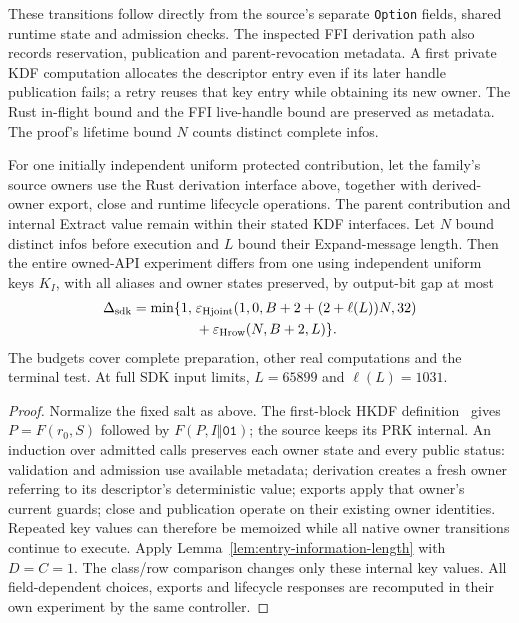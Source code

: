 These transitions follow directly from the source's separate
\texttt{Option} fields, shared runtime state and admission checks. The inspected
FFI derivation path also records reservation, publication and parent-revocation
metadata. A first private KDF computation allocates the descriptor
entry even if its later handle publication fails; a retry reuses that key
entry while obtaining its new owner. The Rust in-flight bound and the
FFI live-handle bound are preserved as metadata. The proof's lifetime bound
$N$ counts distinct complete infos.

\begin{proposition}
\label{prop:sdk-purpose-table}
For one initially independent uniform protected contribution, let the
family's source owners use the Rust derivation interface above, together with
derived-owner export, close and runtime lifecycle operations. The parent
contribution and internal Extract value remain within their stated KDF
interfaces. Let $N$ bound distinct infos before execution and $L$ bound their
Expand-message length. Then the entire owned-API experiment differs from
one using independent uniform keys $K_I$, with all aliases and owner states
preserved, by output-bit gap at most
\begin{equation}
\begin{split}
 \Delta_{\rm sdk}=\min\{1,\;&
 \varepsilon_{\rm Hjoint}(1,0,B+2+(2+\ell(L))N,32)\\
 &+\varepsilon_{\rm Hrow}(N,B+2,L)\}.
\end{split}
 \label{eq:sdk-purpose-error}
\end{equation}
The budgets cover complete preparation, other real computations and the
terminal test. At full SDK input limits, $L=65899$ and $\ell(L)=1031$.
\end{proposition}
\begin{proof}
Normalize the fixed salt as above. The first-block HKDF definition~\cite{rfc5869}
gives $P=F(r_0,S)$ followed by $F(P,I\Vert\mathtt{01})$; the source keeps
its PRK internal.
An induction over admitted calls preserves each owner state and every
public status: validation and admission use available metadata; derivation
creates a fresh owner referring to its descriptor's deterministic value;
exports apply that owner's current guards; close and publication operate
on their existing owner identities. Repeated key values can therefore be
memoized while all native owner transitions continue to execute.
Apply Lemma~\ref{lem:entry-information-length} with $D=C=1$.
The class/row comparison changes only these internal key values. All
field-dependent choices, exports and lifecycle responses are recomputed
in their own experiment by the same controller.
\end{proof}

